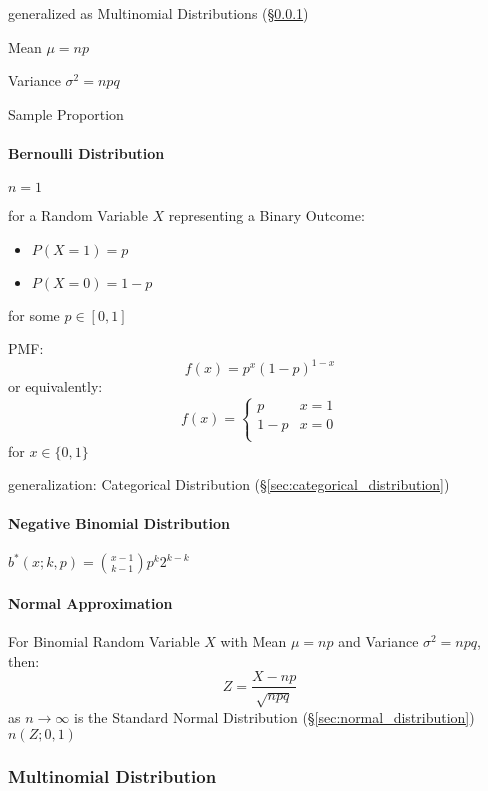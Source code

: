 generalized as Multinomial Distributions (\S\ref{sec:multinomial_distribution})

Mean $\mu = n p$

Variance $\sigma^2 = n p q$

Sample Proportion %



\paragraph{Bernoulli Distribution}\label{sec:bernoulli_distribution}\hfill

$n = 1$

for a Random Variable $X$ representing a Binary Outcome:
\begin{itemize}
  \item $P(X=1) = p$
  \item $P(X=0) = 1-p$
\end{itemize}
for some $p \in [0,1]$

PMF:
\[
  f(x) = p^x(1-p)^{1-x}
\]
or equivalently:
\[
  f(x) = \begin{cases}
    p   & x = 1 \\
    1-p & x = 0 \\
  \end{cases}
\]
for $x \in \{0, 1\}$

generalization: Categorical Distribution (\S\ref{sec:categorical_distribution})



\paragraph{Negative Binomial Distribution}\label{sec:negative_binomial}\hfill

$b^*(x; k,p) = \binom{x-1}{k-1} p^k 2^{k-k}$



\paragraph{Normal Approximation}\label{sec:normal_approximation}\hfill

For Binomial Random Variable $X$ with Mean $\mu = np$ and Variance
$\sigma^2 = npq$, then:
\[
  Z = \frac{X - np}{\sqrt{npq}}
\]
as $n \rightarrow \infty$ is the Standard Normal Distribution
(\S\ref{sec:normal_distribution}) $n(Z;0,1)$



\subsubsection{Multinomial Distribution}\label{sec:multinomial_distribution}


